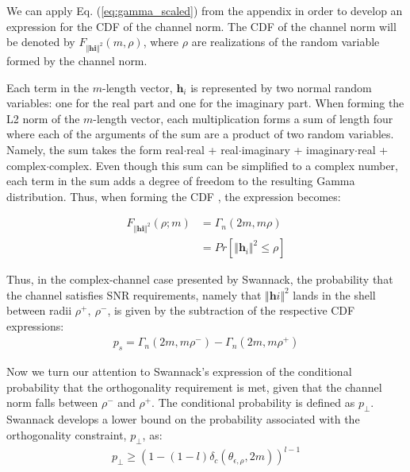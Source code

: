  We can apply Eq. (\ref{eq:gamma_scaled}) from the appendix in order to develop an expression for the CDF of the channel norm. The CDF of the channel norm will be denoted by $F_{\Vert\textbf{hi}\Vert^2}(m,\rho)$, where $\rho$ are realizations of the random variable formed by the channel norm. 

Each term in the $m$-length vector, $\textbf{h}_i$ is represented by two normal random variables: one for the real part and one for the imaginary part. When forming the L2 norm of the $m$-length vector, each multiplication forms a sum of length four where each of the arguments of the sum are a product of two random variables. Namely, the sum takes the form real$\cdot$real + real$\cdot$imaginary + imaginary$\cdot$real + complex$\cdot$complex. Even though this sum can be simplified to a complex number, each term in the sum adds a degree of freedom to the resulting Gamma distribution. Thus, when forming the CDF , the expression becomes:

\begin{equation}\label{eq:ch_sq_cdf_chan}
    \begin{aligned}
        F_{\Vert\textbf{hi}\Vert^2}(\rho;m)& = \Gamma_n(2m,m\rho)\\
        &= Pr[\Vert\textbf{h}_i\Vert^2 \leq \rho]
    \end{aligned}
\end{equation}

Thus, in the complex-channel case presented by Swannack, the probability that the channel satisfies SNR requirements, namely that $\Vert\textbf{h}i\Vert^2$ lands in the shell between radii $\rho^+,\ \rho^-$,  is given by the subtraction of the respective CDF expressions:
\begin{equation}\label{eq:p_s}
    \begin{aligned}
        p_s = \Gamma_n(2m,m\rho^-) - \Gamma_n(2m,m\rho^+)
    \end{aligned}
\end{equation}

Now we turn our attention to Swannack's expression of the conditional probability that the orthogonality requirement is met, given that the channel norm falls between $\rho^-$ and $\rho^+$. The conditional probability is defined as $p_\perp$. Swannack develops a lower bound on the probability associated with the orthogonality constraint, $p_\perp$, as:
\begin{equation}\label{eq:p_perp}
    \begin{aligned}
        p_\perp \geq (1-(1-l)\delta_c(\theta_{\epsilon,\rho},2m))^{l-1}
    \end{aligned}
\end{equation}


